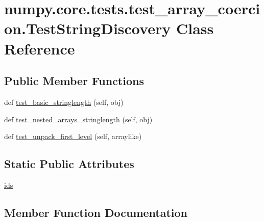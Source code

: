 \hypertarget{classnumpy_1_1core_1_1tests_1_1test__array__coercion_1_1TestStringDiscovery}{}\section{numpy.\+core.\+tests.\+test\+\_\+array\+\_\+coercion.\+Test\+String\+Discovery Class Reference}
\label{classnumpy_1_1core_1_1tests_1_1test__array__coercion_1_1TestStringDiscovery}
\subsection*{Public Member Functions}
\begin{DoxyCompactItemize}
\item 
def \hyperlink{classnumpy_1_1core_1_1tests_1_1test__array__coercion_1_1TestStringDiscovery_a53cbb07e1f228912a9f7a16514f75a3e}{test\+\_\+basic\+\_\+stringlength} (self, obj)
\item 
def \hyperlink{classnumpy_1_1core_1_1tests_1_1test__array__coercion_1_1TestStringDiscovery_a6b9be2d7642f2f516903b93006c60918}{test\+\_\+nested\+\_\+arrays\+\_\+stringlength} (self, obj)
\item 
def \hyperlink{classnumpy_1_1core_1_1tests_1_1test__array__coercion_1_1TestStringDiscovery_a8342f0a5bb324ee54346f8c66e112454}{test\+\_\+unpack\+\_\+first\+\_\+level} (self, arraylike)
\end{DoxyCompactItemize}
\subsection*{Static Public Attributes}
\begin{DoxyCompactItemize}
\item 
\hyperlink{classnumpy_1_1core_1_1tests_1_1test__array__coercion_1_1TestStringDiscovery_a81300f075cc9aa4c37b0845e7736ceac}{ids}
\end{DoxyCompactItemize}


\subsection{Member Function Documentation}
\mbox{\label{classnumpy_1_1core_1_1tests_1_1test__array__coercion_1_1TestStringDiscovery_a53cbb07e1f228912a9f7a16514f75a3e}} 
